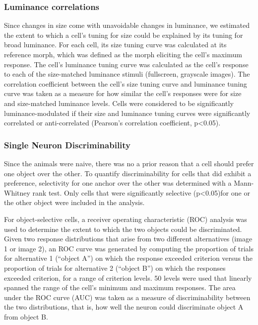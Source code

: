 \subsubsection{Luminance correlations}
Since changes in size come with unavoidable changes in luminance, we estimated the extent to which a cell's tuning for size could be explained by its tuning for broad luminance. For each cell, its size tuning curve was calculated at its reference morph, which was defined as the morph eliciting the cell's maximum response. The cell's luminance tuning curve was calculated as the cell's response to each of the size-matched luminance stimuli (fullscreen, grayscale images). The correlation coefficient between the cell's size tuning curve and luminance tuning curve was taken as a measure for how similar the cell's responses were for size and size-matched luminance levels. Cells were considered to be significantly luminance-modulated if their size and luminance tuning curves were significantly correlated or anti-correlated (Pearson's correlation coefficient, p<0.05).

\subsubsection{Single Neuron Discriminability}
Since the animals were naive, there was no a prior reason that a cell should prefer one object over the other. To quantify discriminability for cells that did exhibit a preference, selectivity for one anchor over the other was determined with a Mann-Whitney rank test. Only cells that were significantly selective (p<0.05)for one or the other object were included in the analysis.  

For object-selective cells, a receiver operating characteristic (ROC) analysis was used to determine the extent to which the two objects could be discriminated\cite{Green1966, Britten1992, Rust2010SelectivityIT}. Given two response distributions that arise from two different alternatives (image 1 or image 2), an ROC curve was generated by computing the proportion of trials for alternative 1 (``object A'') on which the response exceeded criterion versus the proportion of trials for alternative 2 (``object B'') on which the responses exceeded criterion, for a range of criterion levels. 50 levels were used that linearly spanned the range of the cell's minimum and maximum responses. The area under the ROC curve (AUC) was taken as a measure of discriminability between the two distributions, that is, how well the  neuron could discriminate object A from object B. 

